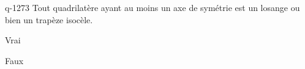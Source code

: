 \begin{truefalse}{q-1273}
Tout quadrilatère ayant au moins un axe de symétrie est un losange ou bien un trapèze isocèle.
\item Vrai
\item* Faux
\end{truefalse}

